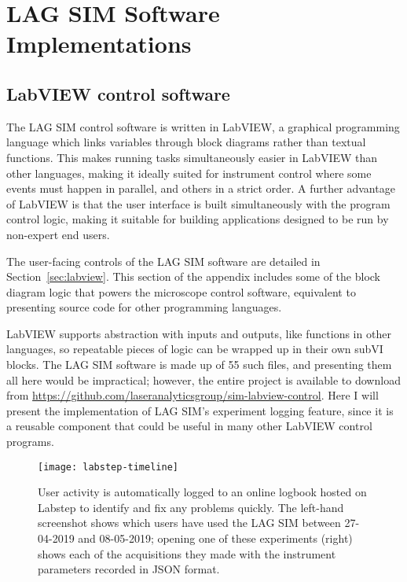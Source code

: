 \chapter{LAG SIM Software Implementations} 

\ifpdf
    \graphicspath{{Appendix1/Figs/Raster/}{Appendix1/Figs/PDF/}{Appendix1/Figs/}}
\else
    \graphicspath{{Appendix1/Figs/Vector/}{Appendix1/Figs/}}
\fi

\section{LabVIEW control software} \label{appx:labview-lagsim}
The LAG SIM control software is written in LabVIEW, a graphical programming language which links variables through block diagrams rather than textual functions. 
This makes running tasks simultaneously easier in LabVIEW than other languages, making it ideally suited for instrument control where some events must happen in parallel, and others in a strict order.
A further advantage of LabVIEW is that the user interface is built simultaneously with the program control logic, making it suitable for building applications designed to be run by non-expert end users. 

The user-facing controls of the LAG SIM software are detailed in Section~\ref{sec:labview}. 
This section of the appendix includes some of the block diagram logic that powers the microscope control software, equivalent to presenting source code for other programming languages. 

LabVIEW supports abstraction with inputs and outputs, like functions in other languages, so repeatable pieces of logic can be wrapped up in their own subVI blocks. 
The LAG SIM software is made up of 55 such files, and presenting them all here would be impractical; however, the entire project is available to download from \url{https://github.com/laseranalyticsgroup/sim-labview-control}. 
Here I will present the implementation of LAG SIM's experiment logging feature, since it is a reusable component that could be useful in many other LabVIEW control programs. 

\begin{sidewaysfigure}[p]
\centering
\texttt{[image: labstep-timeline]}
\caption[Logging user activity with Labstep allows any problems to be identified and fixed quickly]{User activity is automatically logged to an online logbook hosted on Labstep to identify and fix any problems quickly. The left-hand screenshot shows which users have used the LAG SIM between 27-04-2019 and 08-05-2019; opening one of these experiments (right) shows each of the acquisitions they made with the instrument parameters recorded in JSON format.}
\label{fig:labstepTimeline}
\end{sidewaysfigure}

